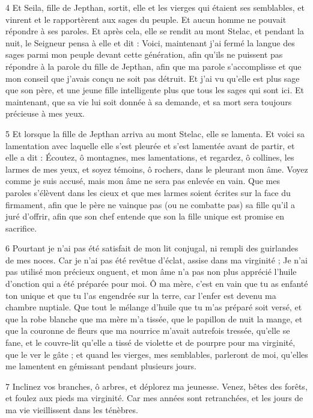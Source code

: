 \par 4 Et Seila, fille de Jepthan, sortit, elle et les vierges qui étaient ses semblables, et vinrent et le rapportèrent aux sages du peuple. Et aucun homme ne pouvait répondre à ses paroles. Et après cela, elle se rendit au mont Stelac, et pendant la nuit, le Seigneur pensa à elle et dit : Voici, maintenant j'ai fermé la langue des sages parmi mon peuple devant cette génération, afin qu'ils ne puissent pas répondre à la parole du fille de Jepthan, afin que ma parole s'accomplisse et que mon conseil que j'avais conçu ne soit pas détruit. Et j'ai vu qu'elle est plus sage que son père, et une jeune fille intelligente plus que tous les sages qui sont ici. Et maintenant, que sa vie lui soit donnée à sa demande, et sa mort sera toujours précieuse à mes yeux.

\par 5 Et lorsque la fille de Jepthan arriva au mont Stelac, elle se lamenta. Et voici sa lamentation avec laquelle elle s'est pleurée et s'est lamentée avant de partir, et elle a dit : Écoutez, ô montagnes, mes lamentations, et regardez, ô collines, les larmes de mes yeux, et soyez témoins, ô rochers, dans le pleurant mon âme. Voyez comme je suis accusé, mais mon âme ne sera pas enlevée en vain. Que mes paroles s'élèvent dans les cieux et que mes larmes soient écrites sur la face du firmament, afin que le père ne vainque pas (ou ne combatte pas) sa fille qu'il a juré d'offrir, afin que son chef entende que son la fille unique est promise en sacrifice.

\par 6 Pourtant je n'ai pas été satisfait de mon lit conjugal, ni rempli des guirlandes de mes noces. Car je n'ai pas été revêtue d'éclat, assise dans ma virginité ; Je n'ai pas utilisé mon précieux onguent, et mon âme n'a pas non plus apprécié l'huile d'onction qui a été préparée pour moi. Ô ma mère, c'est en vain que tu as enfanté ton unique et que tu l'as engendrée sur la terre, car l'enfer est devenu ma chambre nuptiale. Que tout le mélange d'huile que tu m'as préparé soit versé, et que la robe blanche que ma mère m'a tissée, que le papillon de nuit la mange, et que la couronne de fleurs que ma nourrice m'avait autrefois tressée, qu'elle se fane, et le couvre-lit qu'elle a tissé de violette et de pourpre pour ma virginité, que le ver le gâte ; et quand les vierges, mes semblables, parleront de moi, qu'elles me lamentent en gémissant pendant plusieurs jours.

\par 7 Inclinez vos branches, ô arbres, et déplorez ma jeunesse. Venez, bêtes des forêts, et foulez aux pieds ma virginité. Car mes années sont retranchées, et les jours de ma vie vieillissent dans les ténèbres.

